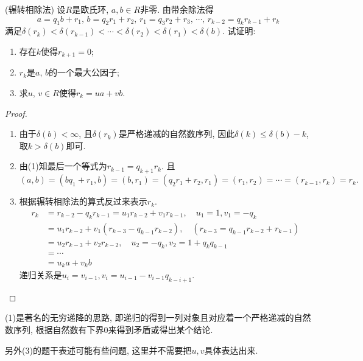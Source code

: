 \documentclass{../solutions-cn}
\begin{document}
\begin{exercise}[习题2.2.4]
    (辗转相除法) 设$R$是欧氏环, $a, b \in R$非零. 由带余除法得
\[
a = q_{1}b + r_{1},\,
b = q_{2}r_{1}+ r_{2},\,
r_{1} = q_{3}r_{2} + r_{3},\, \cdots,\,
r_{k- 2}= q_{k}r_{k- 1}+ r_{k}
\]
满足$\delta(r_k) < \delta(r_{k - 1}) < \cdots < \delta(r_2) < \delta(r_1) < \delta(b)$.
试证明: 
\begin{enumerate}[(1)]
    \item 存在$k$使得$r_{k + 1} = 0$;
    \item $r_k$是$a$, $b$的一个最大公因子;
    \item 求$u$, $v \in R$使得$r_k = ua + vb$.
\end{enumerate}
\end{exercise}

\begin{proof}
\begin{enumerate}[(1)]
    \item 由于$\delta(b) < \infty$, 且$\delta(r_k)$是严格递减的自然数序列, 因此$\delta(k) \leqslant \delta(b) - k$, 取$k > \delta(b)$即可.
    \item 由(1)知最后一个等式为$r_{k - 1} = q_{k + 1}r_{k}$. 且
\[
    (a, b) = (bq_1 + r_1, b) = (b, r_1) = (q_2r_1 + r_2, r_1) = (r_1, r_2) = \cdots = (r_{k - 1}, r_k) = r_k.
\]
    \item 根据辗转相除法的算式反过来表示$r_k$.
\[
    \begin{aligned}
        r_k &= r_{k - 2} - q_kr_{k - 1} = u_1r_{k - 2} + v_1r_{k - 1},\quad u_1 = 1, v_1 = -q_k\\ 
        &= u_1r_{k - 2} + v_1(r_{k - 3} - q_{k - 1}r_{k - 2}),\quad (r_{k - 3} = q_{k - 1}r_{k - 2} + r_{k - 1})\\
        &= u_2r_{k - 3} + v_2r_{k - 2}, \quad u_2 = -q_k, v_2 = 1 + q_kq_{k - 1}\\
        &= \cdots \\
        &= u_ka + v_kb 
    \end{aligned}
\]
递归关系是$u_i = v_{i - 1}, v_i = u_{i - 1} - v_{i - 1}q_{k - i + 1}$.
\end{enumerate}
\end{proof}

\begin{remark}
    (1)是著名的无穷递降的思路, 即递归的得到一列对象且对应着一个严格递减的自然数序列, 根据自然数有下界$0$来得到矛盾或得出某个结论.

    另外(3)的题干表述可能有些问题, 这里并不需要把$u, v$具体表达出来.
\end{remark}
\end{document}
